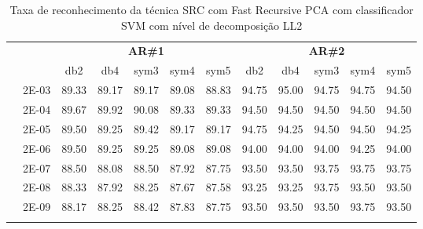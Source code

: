 \begin{table}[H]
\begin{tabular}{|c|c|c c c c c|c c c c c|}
	
\\\midrule
\end{tabular}

\end{table}



\begin{table}[H]
	\centering
    \normalsize
	\caption{Taxa de reconhecimento da técnica SRC com Fast Recursive PCA com classificador SVM com nível de decomposição LL2}
	\begin{tabular}{|c|c|c c c c c|c c c c c|}
\cline{3-12}
\multicolumn{2}{c|}{\multirow{2}{*}{}} & \multicolumn{5}{c|}{\textbf{AR\#1}}  & \multicolumn{5}{c|}{\textbf{AR\#2}} \\\cline{3-12}

\multicolumn{2}{c|}{}  & db2 & db4 & sym3 & sym4 & sym5 & db2 & db4& sym3 & sym4 & sym5 \\\hline
\multicolumn{1}{|c|}{ \multirow{6}{*}{\rotatebox[origin=c]{90}{\textbf{Gamma}}} }
&2E-03&	89.33&	89.17&	89.17&	89.08&	88.83&	94.75&	95.00&	94.75&	94.75&	94.50	\\\cline{2-12}
&2E-04&	89.67&	89.92&	90.08&	89.33&	89.33&	94.50&	94.50&	94.50&	94.50&	94.50	\\\cline{2-12}
&2E-05&	89.50&	89.25&	89.42&	89.17&	89.17&	94.75&	94.25&	94.50&	94.50&	94.25	\\\cline{2-12}
&2E-06&	89.50&	89.25&	89.25&	89.08&	89.08&	94.00&	94.00&	94.00&	94.25&	94.00	\\\cline{2-12}
&2E-07&	88.50&	88.08&	88.50&	87.92&	87.75&	93.50&	93.50&	93.75&	93.75&	93.75	\\\cline{2-12}
&2E-08&	88.33&	87.92&	88.25&	87.67&	87.58&	93.25&	93.25&	93.75&	93.50&	93.50	\\\cline{2-12}
&2E-09&	88.17&	88.25&	88.42&	87.83&	87.75&	93.50&	93.50&	93.50&	93.75&	93.50	
\\ \midrule
\multicolumn{12}{c}{}\\ 


\end{tabular}
\end{table}
